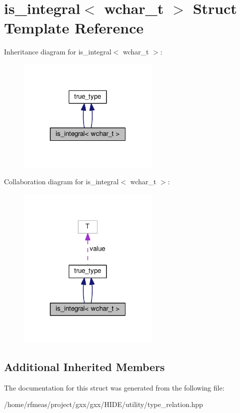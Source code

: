 \hypertarget{structis__integral_3_01wchar__t_01_4}{}\section{is\+\_\+integral$<$ wchar\+\_\+t $>$ Struct Template Reference}
\label{structis__integral_3_01wchar__t_01_4}


Inheritance diagram for is\+\_\+integral$<$ wchar\+\_\+t $>$\+:
\nopagebreak
\begin{figure}[H]
\begin{center}
\leavevmode
\includegraphics[width=193pt]{structis__integral_3_01wchar__t_01_4__inherit__graph}
\end{center}
\end{figure}


Collaboration diagram for is\+\_\+integral$<$ wchar\+\_\+t $>$\+:
\nopagebreak
\begin{figure}[H]
\begin{center}
\leavevmode
\includegraphics[width=193pt]{structis__integral_3_01wchar__t_01_4__coll__graph}
\end{center}
\end{figure}
\subsection*{Additional Inherited Members}


The documentation for this struct was generated from the following file\+:\begin{DoxyCompactItemize}
\item 
/home/rfmeas/project/gxx/gxx/\+H\+I\+D\+E/utility/type\+\_\+relation.\+hpp\end{DoxyCompactItemize}
